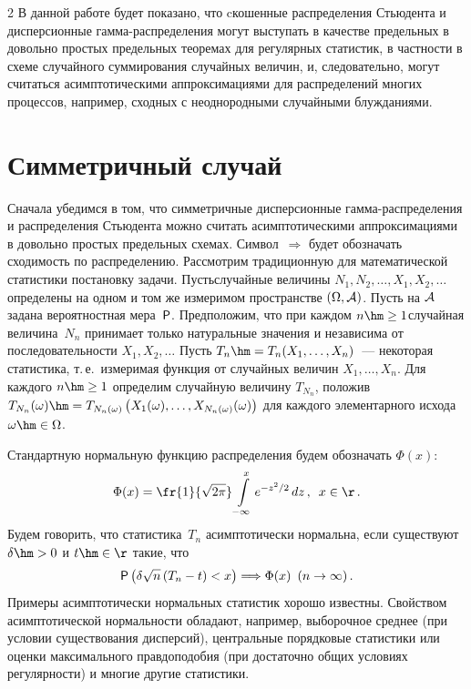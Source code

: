 \begin{multicols}{2}
В данной работе будет показано, что cкошенные распределения
Стьюдента и дисперсионные гам\-ма-рас\-пре\-де\-ле\-ния могут выступать в
качестве предельных в довольно простых предельных теоремах для
регулярных статистик, в частности в схеме случайного суммирования
случайных величин, и, следовательно, могут считаться
асимптотическими аппроксимациями для распределений многих
процессов, например, сходных с неоднородными случайными
блужданиями.

\section{Симметричный случай}

Сначала убедимся в том, что симметричные дисперсионные
гам\-ма-рас\-пре\-де\-ле\-ния и распределения Стьюдента можно считать
асимптотическими аппроксимациями в довольно простых предельных
схемах. Символ~$\Longrightarrow$ будет обозначать сходимость по
распределению. Рассмотрим традиционную для математической
статистики постановку задачи. Пусть\linebreak случайные величины
$N_1,N_2,\ldots ,X_1,X_2,\ldots$ определены на одном и том же
измеримом пространстве $(\Omega,{\cal A})$. Пусть на ${\cal A}$
задана вероятностная мера~${\sf P}$. Предположим, что при каждом
$n\hm\ge 1$\linebreak случайная величина~$N_n$ принимает только натуральные
значения и независима от последовательности $X_1,X_2,\ldots$ Пусть
$T_n\hm=T_n(X_1,\ldots ,X_n)$~--- некоторая статистика, т.\,е.\
измеримая функция от случайных величин $X_1,\ldots ,X_n$. Для
каждого $n\hm\ge1$ определим случайную величину $T_{N_n}$, положив
$T_{N_n}(\omega)\hm= T_{N_n(\omega)}\left(X_1(\omega),\ldots ,X_{N_n(\omega)}(\omega)\right)$
для каждого элементарного исхода $\omega\hm\in\Omega$.

Стандартную нормальную функцию распределения будем обозначать
$\Phi(x)$:
$$
\Phi(x)=\fr{1}{\sqrt{2\pi}}\int\limits_{-\infty}^{x}e^{-z^2/2}\,dz\,,\enskip
 x\in\r\,.
$$
Будем говорить, что статистика~$T_n$ асимптотически нормальна, если
существуют $\delta\hm>0$ и $t\hm\in\r$ такие, что
\begin{equation}
{\sf
P}\left(\delta\sqrt{n}\left (T_n-t\right)<x\right)\Longrightarrow\Phi(x)
\enskip (n\to\infty)\,.\label{e5-kor}
\end{equation}
Примеры асимптотически нормальных статистик хорошо известны.
Свойством асимптотической нормальности обладают, например,
выборочное среднее (при условии существования дисперсий),
центральные порядковые статистики или оценки максимального
правдоподобия (при достаточно общих условиях регулярности) и
многие другие статистики.


\end{multicols}
